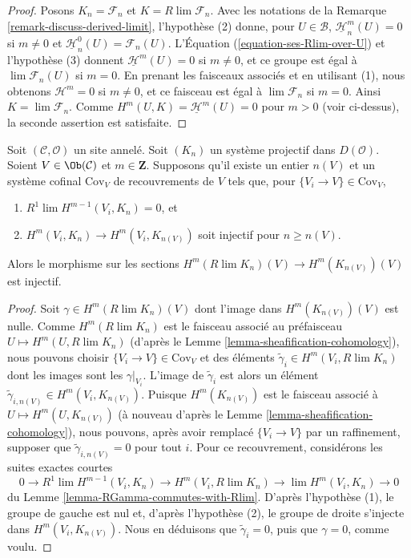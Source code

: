 \begin{proof}
Posons $K_n = \mathcal{F}_n$ et $K = R\lim \mathcal{F}_n$. Avec les
notations de la Remarque \ref{remark-discuss-derived-limit}, l'hypothèse
(2) donne, pour $U \in \mathcal{B}$,
$\underline{\mathcal{H}}_n^m(U) = 0$ si $m \not = 0$ et
$\underline{\mathcal{H}}_n^0(U) = \mathcal{F}_n(U)$. L'Équation
(\ref{equation-ses-Rlim-over-U}) et l'hypothèse (3) donnent
$\underline{\mathcal{H}}^m(U) = 0$ si $m \not = 0$, et ce groupe est égal à
$\lim \mathcal{F}_n(U)$ si $m = 0$. En prenant les faisceaux associés et en
utilisant (1), nous obtenons $\mathcal{H}^m = 0$ si $m \not = 0$, et ce
faisceau est égal à $\lim \mathcal{F}_n$ si $m = 0$. Ainsi
$K = \lim \mathcal{F}_n$. Comme
$H^m(U, K) = \underline{\mathcal{H}}^m(U) = 0$ pour $m > 0$ (voir
ci-dessus), la seconde assertion est satisfaite.
\end{proof}

\begin{lemma}
\label{lemma-cohomology-derived-limit-injective}
Soit $(\mathcal{C}, \mathcal{O})$ un site annelé. Soit $(K_n)$ un système
projectif dans $D(\mathcal{O})$. Soient $V \in \Ob(\mathcal{C})$ et
$m \in \mathbf{Z}$. Supposons qu'il existe un entier $n(V)$ et un système
cofinal $\text{Cov}_V$ de recouvrements de $V$ tels que, pour
$\{V_i \to V\} \in \text{Cov}_V$,
\begin{enumerate}
\item $R^1\lim H^{m - 1}(V_i, K_n) = 0$, et
\item $H^m(V_i, K_n) \to H^m(V_i, K_{n(V)})$ soit injectif pour
$n \geq n(V)$.
\end{enumerate}
Alors le morphisme sur les sections
$H^m(R\lim K_n)(V) \to H^m(K_{n(V)})(V)$ est injectif.
\end{lemma}

\begin{proof}
Soit $\gamma \in H^m(R\lim K_n)(V)$ dont l'image dans
$H^m(K_{n(V)})(V)$ est nulle. Comme $H^m(R\lim K_n)$ est le faisceau
associé au préfaisceau $U \mapsto H^m(U, R\lim K_n)$ (d'après le Lemme
\ref{lemma-sheafification-cohomology}), nous pouvons choisir
$\{V_i \to V\} \in \text{Cov}_V$ et des éléments
$\tilde\gamma_i \in H^m(V_i, R\lim K_n)$ dont les images sont les
$\gamma|_{V_i}$. L'image de $\tilde\gamma_i$ est alors un élément
$\tilde\gamma_{i, n(V)} \in H^m(V_i, K_{n(V)})$. Puisque
$H^m(K_{n(V)})$ est le faisceau associé à
$U \mapsto H^m(U, K_{n(V)})$ (à nouveau d'après le Lemme
\ref{lemma-sheafification-cohomology}), nous pouvons, après avoir remplacé
$\{V_i \to V\}$ par un raffinement, supposer que
$\tilde\gamma_{i, n(V)} = 0$ pour tout $i$. Pour ce recouvrement,
considérons les suites exactes courtes
$$
0 \to
R^1\lim H^{m - 1}(V_i, K_n) \to H^m(V_i, R\lim K_n) \to
\lim H^m(V_i, K_n) \to 0
$$
du Lemme \ref{lemma-RGamma-commutes-with-Rlim}. D'après l'hypothèse (1),
le groupe de gauche est nul et, d'après l'hypothèse (2), le groupe de
droite s'injecte dans $H^m(V_i, K_{n(V)})$. Nous en déduisons que
$\tilde\gamma_i = 0$, puis que $\gamma = 0$, comme voulu.
\end{proof}

